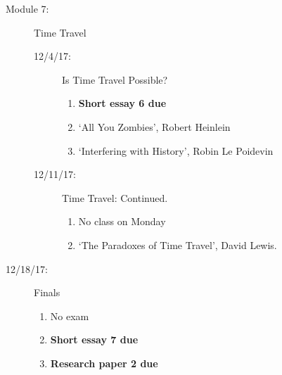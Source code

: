 \documentclass[article,oneside]{memoir}
\begin{document}
\begin{description}
\item[Module 7:] Time Travel
\begin{description}
\item[12/4/17:] Is Time Travel Possible?
\begin{enumerate}
\item \textbf{Short essay 6 due}
\item `All You Zombies', Robert Heinlein 
\item `Interfering with History', Robin Le Poidevin 
\end{enumerate}
\item[12/11/17:] Time Travel: Continued.
\begin{enumerate}
\item No class on Monday
\item `The Paradoxes of Time Travel', David Lewis.
\end{enumerate}
\end{description}
\item[12/18/17:] Finals
\begin{enumerate}
\item No exam
\item \textbf{Short essay 7 due}
\item \textbf{Research paper 2 due}
\end{enumerate}
\end{description}




\end{document}
